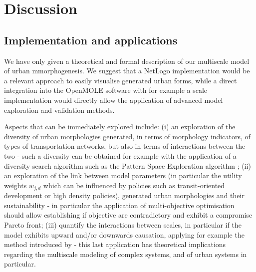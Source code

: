\documentclass[letterpaper]{article}
\begin{document}








\section{Discussion}

\subsection{Implementation and applications}

We have only given a theoretical and formal description of our multiscale model of urban mmorphogenesis. We suggest that a NetLogo implementation would be a relevant approach to easily visualise generated urban forms, while a direct integration into the OpenMOLE software \citep{reuillon2013openmole} with for example a scale implementation would directly allow the application of advanced model exploration and validation methods.

Aspects that can be immediately explored include: (i) an exploration of the diversity of urban morphologies generated, in terms of morphology indicators, of types of transportation networks, but also in terms of interactions between the two - such a diversity can be obtained for example with the application of a diversity search algorithm such as the Pattern Space Exploration algorithm \citep{cherel2015beyond}; (ii) an exploration of the link between model parameters (in particular the utility weights $w_{j,d}$ which can be influenced by policies such as transit-oriented development or high density policies), generated urban morphologies and their sustainability - in particular the application of multi-objective optimisation should allow establishing if objective are contradictory and exhibit a compromise Pareto front; (iii) quantify the interactions between scales, in particular if the model exhibits upward and/or downwards causation, applying for example the method introduced by \cite{seth2010measuring} - this last application has theoretical implications regarding the multiscale modeling of complex systems, and of urban systems in particular.
\end{document}
